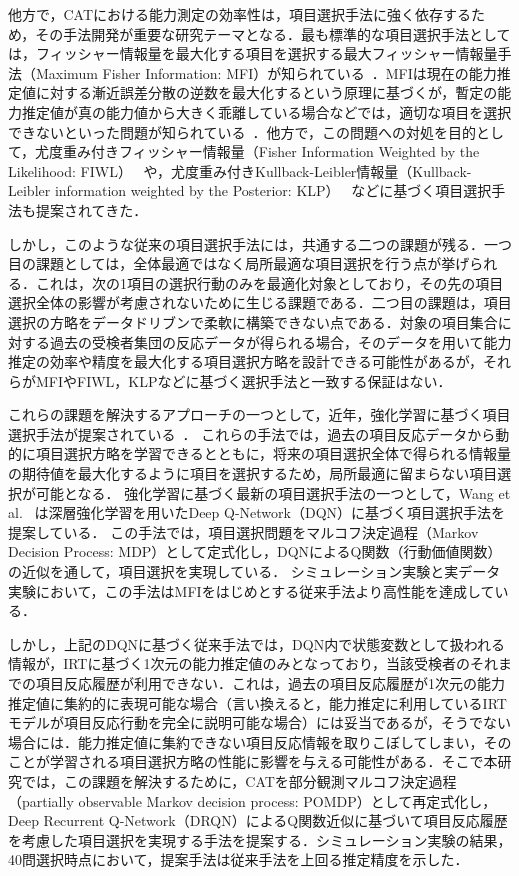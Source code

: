 \documentclass[dvipdfmx,a4j]{jarticle}
\begin{document}
他方で，CATにおける能力測定の効率性は，項目選択手法に強く依存するため，その手法開発が重要な研究テーマとなる．最も標準的な項目選択手法としては，フィッシャー情報量を最大化する項目を選択する最大フィッシャー情報量手法（Maximum Fisher Information: MFI）が知られている~\cite{lord1980}．MFIは現在の能力推定値に対する漸近誤差分散の逆数を最大化するという原理に基づくが，暫定の能力推定値が真の能力値から大きく乖離している場合などでは，適切な項目を選択できないといった問題が知られている~\cite{chang1996}．他方で，この問題への対処を目的として，尤度重み付きフィッシャー情報量（Fisher Information Weighted by the Likelihood: FIWL）~\cite{veerkamp1997} や，尤度重み付きKullback-Leibler情報量（Kullback-Leibler information weighted by the Posterior: KLP）~\cite{chang1996} などに基づく項目選択手法も提案されてきた．

しかし，このような従来の項目選択手法には，共通する二つの課題が残る．一つ目の課題としては，全体最適ではなく局所最適な項目選択を行う点が挙げられる．これは，次の1項目の選択行動のみを最適化対象としており，その先の項目選択全体の影響が考慮されないために生じる課題である．二つ目の課題は，項目選択の方略をデータドリブンで柔軟に構築できない点である．対象の項目集合に対する過去の受検者集団の反応データが得られる場合，そのデータを用いて能力推定の効率や精度を最大化する項目選択方略を設計できる可能性があるが，それらがMFIやFIWL，KLPなどに基づく選択手法と一致する保証はない．

これらの課題を解決するアプローチの一つとして，近年，強化学習に基づく項目選択手法が提案されている~\cite{ghosh2021,nurakhmetov2019,shin2022,wang2024}．
これらの手法では，過去の項目反応データから動的に項目選択方略を学習できるとともに，将来の項目選択全体で得られる情報量の期待値を最大化するように項目を選択するため，局所最適に留まらない項目選択が可能となる．
強化学習に基づく最新の項目選択手法の一つとして，Wang et al.~\cite{wang2024} は深層強化学習を用いたDeep Q-Network（DQN）に基づく項目選択手法を提案している．
この手法では，項目選択問題をマルコフ決定過程（Markov Decision Process: MDP）として定式化し，DQNによるQ関数（行動価値関数）の近似を通して，項目選択を実現している．
シミュレーション実験と実データ実験において，この手法はMFIをはじめとする従来手法より高性能を達成している．

しかし，上記のDQNに基づく従来手法では，DQN内で状態変数として扱われる情報が，IRTに基づく1次元の能力推定値のみとなっており，当該受検者のそれまでの項目反応履歴が利用できない．これは，過去の項目反応履歴が1次元の能力推定値に集約的に表現可能な場合（言い換えると，能力推定に利用しているIRTモデルが項目反応行動を完全に説明可能な場合）には妥当であるが，そうでない場合には．能力推定値に集約できない項目反応情報を取りこぼしてしまい，そのことが学習される項目選択方略の性能に影響を与える可能性がある．そこで本研究では，この課題を解決するために，CATを部分観測マルコフ決定過程（partially observable Markov decision process: POMDP）として再定式化し，Deep Recurrent Q-Network（DRQN）によるQ関数近似に基づいて項目反応履歴を考慮した項目選択を実現する手法を提案する．シミュレーション実験の結果，40問選択時点において，提案手法は従来手法を上回る推定精度を示した．
\end{document}
